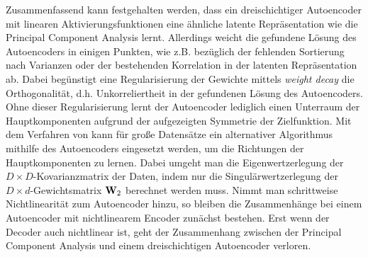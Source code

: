Zusammenfassend kann festgehalten werden, dass ein dreischichtiger Autoencoder mit linearen
Aktivierungsfunktionen eine ähnliche latente Repräsentation wie die Principal Component Analysis
lernt. Allerdings weicht die gefundene Lösung des Autoencoders in einigen Punkten, wie z.B.
bezüglich der fehlenden Sortierung nach Varianzen oder der bestehenden Korrelation in der latenten
Repräsentation ab. Dabei begünstigt eine Regularisierung der Gewichte mittels \textit{weight decay}
die Orthogonalität, d.h. Unkorreliertheit in der gefundenen Lösung des Autoencoders. Ohne dieser
Regularisierung lernt der Autoencoder lediglich einen Unterraum der Hauptkomponenten aufgrund der
aufgezeigten Symmetrie der Zielfunktion. Mit dem Verfahren von \textcite{Plaut.2018} kann für große
Datensätze ein alternativer Algorithmus mithilfe des Autoencoders eingesetzt werden, um die
Richtungen der Hauptkomponenten zu lernen. Dabei umgeht man die Eigenwertzerlegung der $D \times
	D$-Kovarianzmatrix der Daten, indem nur die Singulärwertzerlegung der $D \times d$-Gewichtsmatrix
$\mathbf{W}_2$ berechnet werden muss. Nimmt man schrittweise Nichtlinearität zum Autoencoder hinzu, so
bleiben die Zusammenhänge bei einem Autoencoder mit nichtlinearem Encoder zunächst bestehen. Erst
wenn der Decoder auch nichtlinear ist, geht der Zusammenhang zwischen der Principal Component
Analysis und einem dreischichtigen Autoencoder verloren.